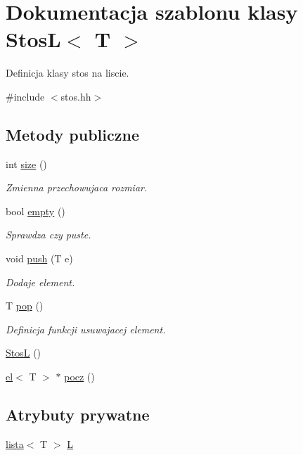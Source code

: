 \hypertarget{class_stos_l}{\section{\-Dokumentacja szablonu klasy \-Stos\-L$<$ \-T $>$}
\label{class_stos_l}
}


\-Definicja klasy stos na liscie.  




{\ttfamily \#include $<$stos.\-hh$>$}

\subsection*{\-Metody publiczne}
\begin{DoxyCompactItemize}
\item 
int \hyperlink{class_stos_l_aa33a51cb0ca3dbf005df8765586ce964}{size} ()
\begin{DoxyCompactList}\small\item\em \-Zmienna przechowujaca rozmiar. \end{DoxyCompactList}\item 
bool \hyperlink{class_stos_l_a6ea23455139de8753792dc8682890055}{empty} ()
\begin{DoxyCompactList}\small\item\em \-Sprawdza czy puste. \end{DoxyCompactList}\item 
void \hyperlink{class_stos_l_af72c5941f1f181fc6b76570d978986d9}{push} (\-T e)
\begin{DoxyCompactList}\small\item\em \-Dodaje element. \end{DoxyCompactList}\item 
\-T \hyperlink{class_stos_l_a0430ba75c3c71ed85362cbbe8e8dc2bd}{pop} ()
\begin{DoxyCompactList}\small\item\em \-Definicja funkcji usuwajacej element. \end{DoxyCompactList}\item 
\hyperlink{class_stos_l_a83b21e73af5cc36dc0ea91a03be324b4}{\-Stos\-L} ()
\item 
\hyperlink{classel}{el}$<$ \-T $>$ $\ast$ \hyperlink{class_stos_l_a48f686406573e0b16b3ab1e1ece8989b}{pocz} ()
\end{DoxyCompactItemize}
\subsection*{\-Atrybuty prywatne}
\begin{DoxyCompactItemize}
\item 
\hyperlink{classlista}{lista}$<$ \-T $>$ \hyperlink{class_stos_l_ac18d4c73355b3e6a9ad47aedae6a77ca}{\-L}
\end{DoxyCompactItemize}


